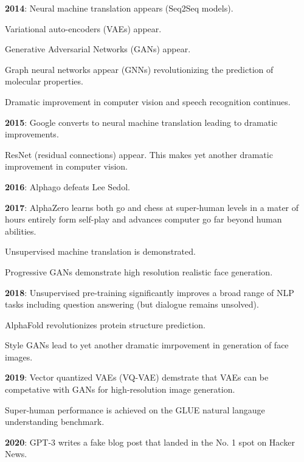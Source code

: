 {

{\bf 2014}: Neural machine translation appears (Seq2Seq models).

\vfill
Variational auto-encoders (VAEs) appear.

\vfill
Generative Adversarial Networks (GANs) appear.

\vfill
Graph neural networks appear (GNNs) revolutionizing the prediction of molecular properties.

\vfill
Dramatic improvement in computer vision and speech recognition continues.


{\bf 2015}: Google converts to neural machine translation leading to dramatic improvements.

\vfill
ResNet (residual connections) appear.  This makes yet another dramatic improvement in computer vision.

\vfill
{\bf 2016}: Alphago defeats Lee Sedol.


{\bf 2017}: AlphaZero learns both go and chess at super-human levels in a mater of hours entirely form self-play and advances computer go far beyond human abilities.

\vfill
Unsupervised machine translation is demonstrated.

\vfill
Progressive GANs demonstrate high resolution realistic face generation.


{\bf 2018}: Unsupervised pre-training significantly improves a broad range of NLP tasks including question answering (but dialogue remains unsolved).

\vfill
AlphaFold revolutionizes protein structure prediction.

\vfill
Style GANs lead to yet another dramatic imrpovement in generation of face images.

\vfill{\bf 2019}:
Vector quantized VAEs (VQ-VAE) demstrate that VAEs can be competative with GANs for high-resolution image generation.

\vfill
Super-human performance is achieved on the GLUE natural langauge understanding benchmark.


\vfill{\bf 2020}:
GPT-3 writes a fake blog post that landed in the No. 1 spot on Hacker News.


}
